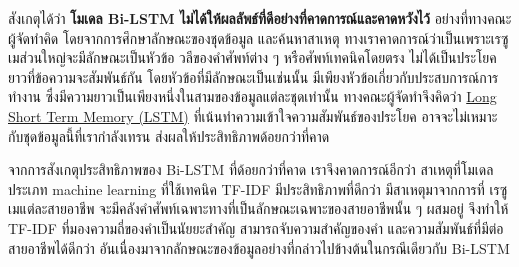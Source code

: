\par{
    สังเกตุได้ว่า \textbf{โมเดล Bi-LSTM ไม่ได้ให้ผลลัพธ์ที่ดีอย่างที่คาดการณ์และคาดหวังไว้} อย่างที่ทางคณะผู้จัดทำคิด โดยจากการศึกษาลักษณะของชุดข้อมูล และค้นหาสาเหตุ
    ทางเราคาดการณ์ว่าเป็นเพราะเรซูเมส่วนใหญ่จะมีลักษณะเป็นหัวข้อ วลีของคำศัพท์ต่าง ๆ หรือศัพท์เทคนิคโดยตรง ไม่ได้เป็นประโยคยาวที่ข้อความจะสัมพันธ์กัน
    โดยหัวข้อที่มีลักษณะเป็นเช่นนั้น มีเพียงหัวข้อเกี่ยวกับประสบการณ์การทำงาน ซึ่งมีความยาวเป็นเพียงหนึ่งในสามของข้อมูลแต่ละชุดเท่านั้น
    ทางคณะผู้จัดทำจึงคิดว่า \hyperref[subsec:lstm]{Long Short Term Memory (LSTM)} ที่เน้นทำความเข้าใจความสัมพันธ์ของประโยค
    อาจจะไม่เหมาะกับชุดข้อมูลนี้ที่เรากำลังเทรน ส่งผลให้ประสิทธิภาพด้อยกว่าที่คาด
}
\par{
    จากการสังเกตุประสิทธิภาพของ Bi-LSTM ที่ด้อยกว่าที่คาด เราจึงคาดการณ์อีกว่า สาเหตุที่โมเดลประเภท machine learning ที่ใช้เทคนิค TF-IDF มีประสิทธิภาพที่ดีกว่า
    มีสาเหตุมาจากการที่ เรซูเมแต่ละสายอาชีพ จะมีคลังคำศัพท์เฉพาะทางที่เป็นลักษณะเฉพาะของสายอาชีพนั้น ๆ ผสมอยู่ จึงทำให้ TF-IDF ที่มองความถี่ของคำเป็นนัยยะสำคัญ
    สามารถจับความสำคัญของคำ และความสัมพันธ์ที่มีต่อสายอาชีพได้ดีกว่า อันเนื่องมาจากลักษณะของข้อมูลอย่างที่กล่าวไปข้างต้นในกรณีเดียวกับ Bi-LSTM
}


